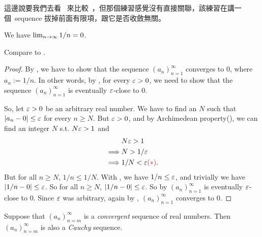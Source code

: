 \begin{note}
這邊說要我們去看\  來比較\ ，但那個練習感覺沒有直接關聯，該練習在講一個\ sequence 拔掉前面有限項，跟它是否收斂無關。
\end{note}

\begin{proposition} \label{prop 6.1.11}
We have \(\lim_{n \to \infty} 1/n = 0\).
\end{proposition}

\begin{note}
Compare to .
\end{note}

\begin{proof}
By , we have to show that the sequence \((a_n)_{n = 1}^{\infty}\) converges to \(0\), where \(a_n := 1/n\).
In other words, by , for every \(\varepsilon > 0\), we need to show that the sequence \((a_n)_{n = 1}^{\infty}\) is eventually \(\varepsilon\)-close to \(0\).

So, let \(\varepsilon > 0\) be an arbitrary real number.
We have to find an \(N\) such that \(\lvert a_n - 0\rvert \le \varepsilon\) for every \(n \ge N\).
But \(\varepsilon > 0\), and by Archimedean property(), we can find an integer \(N\) s.t. \(N\varepsilon > 1\) and
\begin{align*}
             & N \varE > 1 \\
    \implies & N > 1/\varE \\
    \implies & 1/N < \varE \MAROON{(*)}.
\end{align*}
But for all \(n \ge N\), \(1/n \le 1/N\).
With \MAROON{(*)}, we have \(1/n \le \varepsilon\), and trivially we have \(\lvert1/n - 0\rvert \le \varepsilon\).
So for all \(n \ge N\), \(\lvert1/n - 0\rvert \le \varepsilon\).
So by  \((a_n)_{n = 1}^{\infty}\) is eventually \(\varepsilon\)-close to \(0\).
Since \(\varepsilon\) was arbitrary, again by , \((a_n)_{n = 1}^{\infty}\) converges to \(0\).
\end{proof}

\begin{proposition}  \label{prop 6.1.12}
Suppose that \((a_n)_{n = m}^{\infty}\) is a \emph{convergent} sequence of real numbers.
Then \((a_n)_{n = m}^{\infty}\) is also a \emph{Cauchy} sequence.
\end{proposition}

